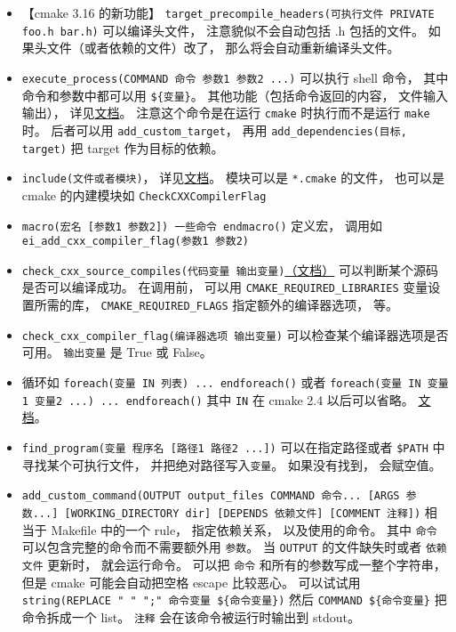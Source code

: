 \begin{itemize}
\item 【cmake 3.16 的新功能】 \verb`target_precompile_headers(可执行文件 PRIVATE foo.h bar.h)` 可以编译头文件， 注意貌似不会自动包括 .h 包括的文件。 如果头文件（或者依赖的文件）改了， 那么将会自动重新编译头文件。
\item \verb`execute_process(COMMAND 命令 参数1 参数2 ...)` 可以执行 shell 命令， 其中命令和参数中都可以用 \verb`${变量}`。 其他功能（包括命令返回的内容， 文件输入输出）， 详见\href{https://cmake.org/cmake/help/latest/command/execute_process.html}{文档}。 注意这个命令是在运行 \verb`cmake` 时执行而不是运行 \verb`make` 时。 后者可以用 \verb`add_custom_target`， 再用 \verb`add_dependencies(目标, target)` 把 target 作为目标的依赖。
\item \verb`include(文件或者模块)`， 详见\href{https://cmake.org/cmake/help/latest/command/include.html}{文档}。 模块可以是 \verb`*.cmake` 的文件， 也可以是 cmake 的内建模块如 \verb`CheckCXXCompilerFlag`
\item \verb`macro(宏名 [参数1 参数2]) 一些命令 endmacro()` 定义宏， 调用如 \verb`ei_add_cxx_compiler_flag(参数1 参数2)`
\item \verb`check_cxx_source_compiles(代码变量 输出变量)`\href{https://cmake.org/cmake/help/latest/module/CheckCXXSourceCompiles.html}{（文档）} 可以判断某个源码是否可以编译成功。 在调用前， 可以用 \verb`CMAKE_REQUIRED_LIBRARIES` 变量设置所需的库， \verb`CMAKE_REQUIRED_FLAGS` 指定额外的编译器选项， 等。
\item \verb`check_cxx_compiler_flag(编译器选项 输出变量)` 可以检查某个编译器选项是否可用。 \verb`输出变量` 是 True 或 False。
\item 循环如 \verb`foreach(变量 IN 列表) ... endforeach()` 或者 \verb`foreach(变量 IN 变量1 变量2 ...) ... endforeach()` 其中 \verb`IN` 在 cmake 2.4 以后可以省略。 \href{https://cmake.org/cmake/help/latest/command/foreach.html}{文档}。
\item \verb`find_program(变量 程序名 [路径1 路径2 ...])` 可以在指定路径或者 \verb`$PATH` 中寻找某个可执行文件， 并把绝对路径写入\verb`变量`。 如果没有找到， 会赋空值。
\item \verb`add_custom_command(OUTPUT output_files COMMAND 命令... [ARGS 参数...] [WORKING_DIRECTORY dir] [DEPENDS 依赖文件] [COMMENT 注释])` 相当于 Makefile 中的一个 rule， 指定依赖关系， 以及使用的命令。 其中 \verb`命令` 可以包含完整的命令而不需要额外用 \verb`参数`。 当 \verb`OUTPUT` 的文件缺失时或者 \verb`依赖文件` 更新时， 就会运行命令。 可以把 \verb`命令` 和所有的参数写成一整个字符串， 但是 cmake 可能会自动把空格 escape 比较恶心。 可以试试用 \verb`string(REPLACE " " ";" 命令变量 ${命令变量})` 然后 \verb`COMMAND ${命令变量}` 把命令拆成一个 list。 \verb`注释` 会在该命令被运行时输出到 stdout。

\end{itemize}
